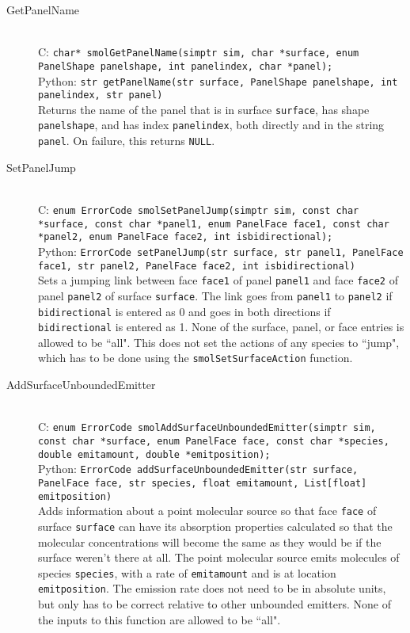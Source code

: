 \documentclass {book}
\begin{document}
\begin{description}
\item[GetPanelName]
\hfill \\
C: \texttt{char* smolGetPanelName(simptr sim, char *surface, enum PanelShape panelshape, int panelindex, char *panel);}\\
Python: \texttt{str getPanelName(str surface, PanelShape panelshape, int panelindex, str panel)}\\
Returns the name of the panel that is in surface \texttt{surface}, has shape \texttt{panelshape}, and has index \texttt{panelindex}, both directly and in the string \texttt{panel}. On failure, this returns \texttt{NULL}.

\item[SetPanelJump]
\hfill \\
C: \texttt{enum ErrorCode smolSetPanelJump(simptr sim, const char *surface, const char *panel1, enum PanelFace face1, const char *panel2, enum PanelFace face2, int isbidirectional);}\\
Python: \texttt{ErrorCode setPanelJump(str surface, str panel1, PanelFace face1, str panel2, PanelFace face2, int isbidirectional)}\\
Sets a jumping link between face \texttt{face1} of panel \texttt{panel1} and face \texttt{face2} of panel \texttt{panel2} of surface \texttt{surface}. The link goes from \texttt{panel1} to \texttt{panel2} if \texttt{bidirectional} is entered as 0 and goes in both directions if \texttt{bidirectional} is entered as 1. None of the surface, panel, or face entries is allowed to be ``all". This does not set the actions of any species to ``jump", which has to be done using the \texttt{smolSetSurfaceAction} function.

\item[AddSurfaceUnboundedEmitter]
\hfill \\
C: \texttt{enum ErrorCode smolAddSurfaceUnboundedEmitter(simptr sim, const char *surface, enum PanelFace face, const char *species, double emitamount, double *emitposition);}\\
Python: \texttt{ErrorCode addSurfaceUnboundedEmitter(str surface, PanelFace face, str species, float emitamount, List[float] emitposition)}\\
Adds information about a point molecular source so that face \texttt{face} of surface \texttt{surface} can have its absorption properties calculated so that the molecular concentrations will become the same as they would be if the surface weren't there at all. The point molecular source emits molecules of species \texttt{species}, with a rate of \texttt{emitamount} and is at location \texttt{emitposition}. The emission rate does not need to be in absolute units, but only has to be correct relative to other unbounded emitters. None of the inputs to this function are allowed to be ``all".


\end{description}
\end{document}
